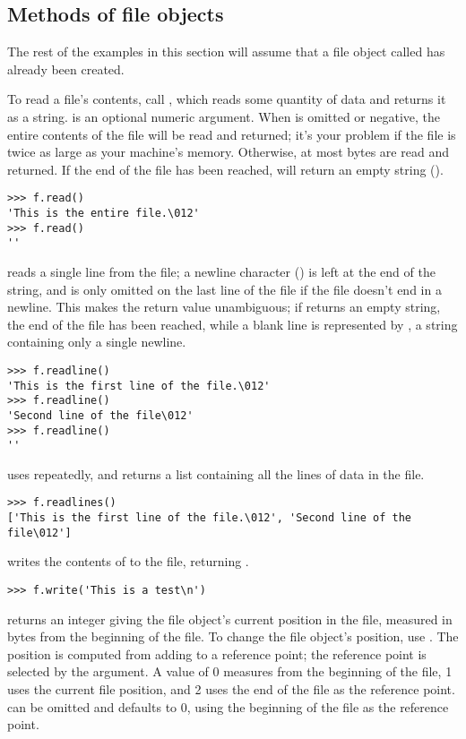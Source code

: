 \subsection{Methods of file objects}

The rest of the examples in this section will assume that a file
object called  has already been created.

To read a file's contents, call , which reads
some quantity of data and returns it as a string.   is an
optional numeric argument.  When  is omitted or negative,
the entire contents of the file will be read and returned; it's your
problem if the file is twice as large as your machine's memory.
Otherwise, at most  bytes are read and returned.  If the end
of the file has been reached,  will return an empty
string ().
\bcode\begin{verbatim}
>>> f.read()
'This is the entire file.\012'
>>> f.read()
''
\end{verbatim}\ecode
%
 reads a single line from the file; a newline
character (\code{\\n}) is left at the end of the string, and is only
omitted on the last line of the file if the file doesn't end in a
newline.  This makes the return value unambiguous; if
 returns an empty string, the end of the file has
been reached, while a blank line is represented by , a
string containing only a single newline.  

\bcode\begin{verbatim}
>>> f.readline()
'This is the first line of the file.\012'
>>> f.readline()
'Second line of the file\012'
>>> f.readline()
''
\end{verbatim}\ecode
%
 uses  repeatedly, and returns
a list containing all the lines of data in the file.

\bcode\begin{verbatim}
>>> f.readlines()
['This is the first line of the file.\012', 'Second line of the file\012']
\end{verbatim}\ecode
%
 writes the contents of  to
the file, returning .  

\bcode\begin{verbatim}
>>> f.write('This is a test\n')
\end{verbatim}\ecode
%
 returns an integer giving the file object's current
position in the file, measured in bytes from the beginning of the
file.  To change the file object's position, use
.  The position is
computed from adding  to a reference point; the reference
point is selected by the  argument.  A 
value of 0 measures from the beginning of the file, 1 uses the current
file position, and 2 uses the end of the file as the reference point.
can be omitted and defaults to 0, using the beginning of the file as the reference point.

